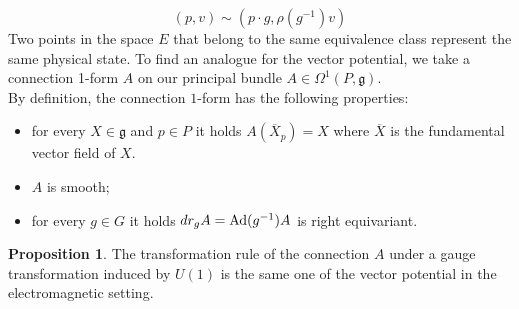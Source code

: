 \documentclass[12pt,a4paper]{report}
\theoremstyle{definition}
\theoremstyle{Theorem}
\newtheorem{Prop}[Def]{Proposition}
\theoremstyle{definition}
\theoremstyle{definition}
\begin{document}
	$$(p,v)\sim(p\cdot g,\rho(g^{-1})v)$$
	Two points in the space $E$ that belong to the same equivalence class represent the same physical state. To find an analogue for the vector potential, we take a connection 1-form $A$ on our principal bundle $A\in\Omega^1(P,\mathfrak{g})$.\\
	By definition, the connection $1$-form has the following properties:
	\begin{itemize}
		\item for every $X\in \mathfrak{g}$ and $p\in P$ it holds $A(\overline{X}_p)=X$ where $\overline{X}$ is the fundamental vector field of $X$.
		\item $A$ is smooth;
		\item for every $g\in G$ it holds $dr_gA=\hbox{Ad}(g^{-1})A$ is right equivariant.
	\end{itemize}
	\begin{Prop}
		The transformation rule of the connection $A$ under a gauge transformation induced by $U(1)$ is the same one of the vector potential in the electromagnetic setting.
	\end{Prop}
\end{document}
